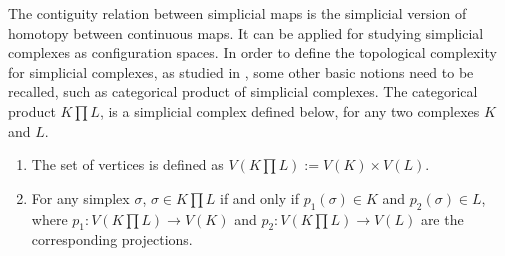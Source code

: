 \documentclass[preprint,11pt %
]{hjm1}
\newtheorem{theorem}{Theorem}[section]
\theoremstyle{definition}
\newtheorem{definition}[theorem]{Definition}
\begin{document}
The contiguity relation between simplicial maps is the simplicial version of homotopy between continuous maps. It can be applied for studying simplicial complexes as configuration spaces. 
In order to define the topological complexity for simplicial complexes, as studied in \cite{dis}, some other basic notions need to be recalled, such as categorical product of simplicial complexes.
The categorical product $K\prod  L$, is a simplicial complex defined below, for any two complexes $K$ and $L$.
 \begin{enumerate}
 \item[$\bullet$]
The set of vertices is defined as $V(K\prod  L):=V(K)\times V(L)$.
 \item[$\bullet$]
For any simplex $\sigma$, $\sigma \in K\prod  L$ if and only if $p_1 (\sigma )\in K$ and $p_2 (\sigma )\in L$, where  $p_1 :V(K\prod  L)\to V(K)$ and $p_2 :V(K\prod  L)\to V(L)$ are the corresponding projections.
 \end{enumerate}
\end{document}
